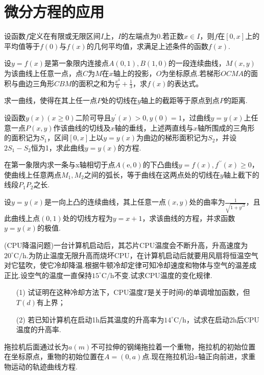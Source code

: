 \section{微分方程的应用}
\begin{xiti}
	\item 设函数$f$定义在有限或无限区间$I$上，$I$的左端点为0.若正数$x\in I$，则$f$在$[0,x]$上的平均值等于$f(0)$与$f(x)$的几何平均值，求满足上述条件的函数$f(x)$.
	\item 设$y=f(x)$是第一象限内连接点$A(0,1), B(1,0)$的一段连续曲线，$M(x,y)$为该曲线上任意一点，点$C$为$M$在$x$轴上的投影，$O$为坐标原点.若梯形$OCMA$的面积与曲边三角形$CBM$的面积之和为$\frac{x^{3}}{6}+\frac{1}{3}$，求$f(x)$的表达式。
	
	\item 求一曲线，使得在其上任一点$P$处的切线在$y$轴上的截距等于原点到点$P$的距离.
	
	\item 设函数$y(x)(x \geqslant 0)$二阶可导且$y^{\prime}(x)>0, y(0)=1$，过曲线$y=y(x)$上任意一点$P(x, y)$作该曲线的切线及$x$轴的垂线，上述两直线与$x$轴所围成的三角形的面积记为$S_{1}$，区间$[0,x]$上以$y=y(x)$为曲边的梯形面积记为$S_{2}$，并设$2S_{1}-S_{2}$恒为1，求此曲线$y=y(x)$的方程.
	
	\item 	在第一象限内求一条与x轴相切于点$A(\mathrm{e}, 0)$的下凸曲线$y=f(x), f^{\prime \prime}(x) \geqslant 0$，使曲线上任意两点$M_{1},M_{2}$之间的弧长，等于曲线在这两点处的切线在$y$轴上截下的线段$P_{1}P_{2}$之长.
	\item 设$y=y(x)$是一向上凸的连续曲线，其上任意一点$(x,y)$处的曲率为$\frac{1}{\sqrt{1+y'^{2}}}$，且此曲线上点$(0,1)$处的切线方程为$y=x+1$，求该曲线的方程，并求函数$y=y(x)$的极值.
	
	\item  (CPU降温问题)一台计算机启动后，其芯片CPU温度会不断升高，升高速度为$20^{\circ} \mathrm{C} / \mathrm{h}$.为防止温度无限升高而烧坏CPU，在计算机启动后就要用风扇将恒温空气对它猛吹，使它冷却降温.根据牛顿冷却定律可知冷却速度和物体与空气的温差成正比.设空气的温度一直保持$15^{\circ} \mathrm{C} / \mathrm{h}$不变.试求CPU温度的变化规律.
	
	\begin{enumerate}
		\item [(1)]试证明在这种冷却方法下，CPU温度$T$是关于时间$t$的单调增加函数，但$T(d)$有上界；
		
		\item [(2)]若已知计算机在启动1h后其温度的升高率为$14^{\circ} \mathrm{C} / \mathrm{h}$，试求在启动2h后CPU温度的升高率.
	\end{enumerate}
	\item 拖拉机后面通过长为$a(m)$不可拉伸的钢绳拖拉着一个重物，拖拉机的初始位置在坐标原点，重物的初始位置在$A=(0,a)$点.现在拖拉机沿$x$轴正向前进，求重物运动的轨迹曲线方程.
	

\end{xiti}
